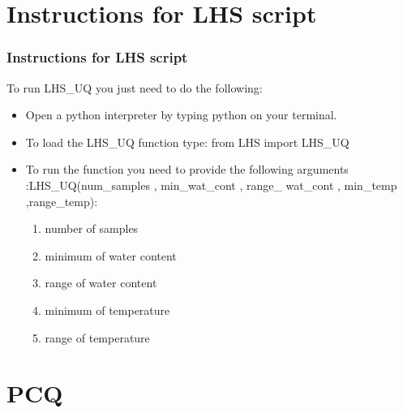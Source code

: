 \documentclass[10pt]{beamer}
\begin{document}
\section{Instructions for LHS script}
\begin{frame}
\frametitle{Instructions for LHS script}
To run LHS\_UQ you just need to do the following:
 \begin{itemize}
 
 \item Open a python interpreter by typing python on your terminal.
 \item To load the LHS\_UQ function type: from LHS import LHS\_UQ 
 \item To run the function you need to provide the following arguments :\newline LHS\_UQ(num\_samples , min\_wat\_cont , range\_ wat\_cont , min\_temp ,range\_temp):
   \begin{enumerate}
 \item number of samples
 \item minimum of water content
 \item range of water content
 \item minimum of temperature
 \item range of temperature
 \end{enumerate}
 \end{itemize}
\end{frame}

\section{PCQ}
\end{document}
